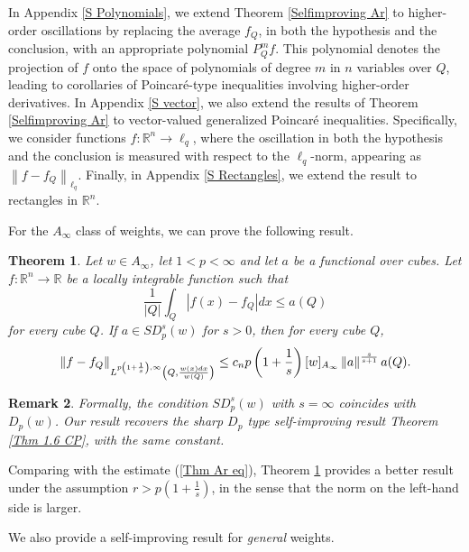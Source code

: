 \documentclass[reqno, 10pt, oneside]{amsart}
\numberwithin{equation}{section}
\newcommand{\strt}[1]{\rule{0pt}{#1}}
\newtheorem{theorem}{Theorem}
\newtheorem{remark}[theorem]{Remark}
\numberwithin{theorem}{section}
\newcommand{\R}{{\mathbb R}}
\newcommand{\norm}[1]{\left\|#1\right\|}
\newcommand{\1}{{\rm 1\hspace*{-0.4ex}%
\rule{0.1ex}{1.52ex}\hspace*{0.2ex}}}
\begin{document}
In Appendix \ref{S Polynomials}, we extend Theorem \ref{Selfimproving Ar} to higher-order oscillations by replacing the average $f_Q$, in both the hypothesis and the conclusion, with an appropriate polynomial $P_Q^m f$. This polynomial denotes the projection of $f$ onto the space of polynomials of degree $m$ in $n$ variables over $Q$, leading to corollaries of Poincaré-type inequalities involving higher-order derivatives.  In Appendix \ref{S vector}, we also extend the results of Theorem \ref{Selfimproving Ar} to vector-valued generalized Poincaré inequalities. Specifically, we consider functions $f: \mathbb{R}^n \longrightarrow \ell_q$, where the oscillation in both the hypothesis and the conclusion is measured with respect to the $\ell_q$-norm, appearing as $\norm{f-f_Q}_{\ell_q}$. Finally, in Appendix \ref{S Rectangles}, we extend the result to rectangles in $\R^n$.  

For the $A_\infty$ class of weights, we can prove the following result. 

\begin{theorem}\label{Selfimproving Ainfty}
	Let $w\in A_\infty$, let $1<p<\infty$ and let $a$ be a functional over cubes. Let $f:\R^n \longrightarrow \R$ be a locally integrable function such that
		\begin{equation}\label{starting-point}
			\frac{1}{|Q|} \int_Q |f(x)-f_Q|dx \le a(Q)
		\end{equation}
		for every cube $Q$.
		If $a\in SD_p^s(w)$ for $s>0$, then for every cube $Q$,
			\begin{equation*}
				\norm{f-f_Q}_{\strt{2.3ex}L^{p\left(1+\frac{1}{s}\right),\infty}\left(Q, \frac{w(x)dx}{w(Q)}\right)} \le c_n p \left(1+\frac{1}{s}\right) [w]_{A_\infty} \left\| a\right\|^\frac{s}{s+1} a(Q).
			\end{equation*}	
\end{theorem}

\begin{remark}
	Formally, the condition $SD_p^s(w)$ with $s=\infty$ coincides with $D_p(w)$. Our result recovers the sharp $D_p$ type self-improving result Theorem \ref{Thm 1.6 CP}, with the same constant.
\end{remark}

Comparing with the estimate (\ref{Thm Ar eq}), Theorem \ref{Selfimproving Ainfty} provides a better result under the assumption $ r > p\left(1+\frac{1}{s}\right)$, in the sense that the norm on the left-hand side is larger. 

We also provide a self-improving result for {\it general} weights. 
\end{document}
